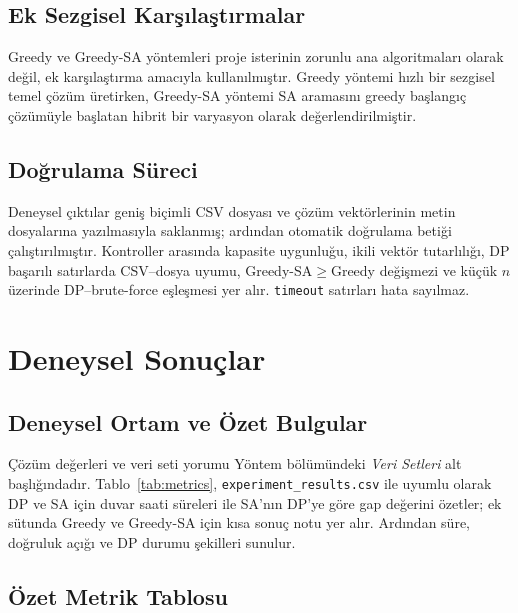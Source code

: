 \documentclass[conference,a4paper]{IEEEtran}
\begin{document}
\subsection{Ek Sezgisel Karşılaştırmalar}
Greedy ve Greedy-SA yöntemleri proje isterinin zorunlu ana algoritmaları olarak değil, ek karşılaştırma amacıyla kullanılmıştır. Greedy yöntemi hızlı bir sezgisel temel çözüm üretirken, Greedy-SA yöntemi SA aramasını greedy başlangıç çözümüyle başlatan hibrit bir varyasyon olarak değerlendirilmiştir.

\subsection{Doğrulama Süreci}
Deneysel çıktılar geniş biçimli CSV dosyası ve çözüm vektörlerinin metin dosyalarına yazılmasıyla saklanmış; ardından otomatik doğrulama betiği çalıştırılmıştır. Kontroller arasında kapasite uygunluğu, ikili vektör tutarlılığı, DP başarılı satırlarda CSV--dosya uyumu, Greedy-SA$\geq$Greedy değişmezi ve küçük $n$ üzerinde DP--brute-force eşleşmesi yer alır. \texttt{timeout} satırları hata sayılmaz.

\section{Deneysel Sonuçlar}

\subsection{Deneysel Ortam ve Özet Bulgular}
Çözüm değerleri ve veri seti yorumu Yöntem bölümündeki \emph{Veri Setleri} alt başlığındadır. Tablo~\ref{tab:metrics}, \texttt{experiment\_results.csv} ile uyumlu olarak DP ve SA için duvar saati süreleri ile SA'nın DP'ye göre gap değerini özetler; ek sütunda Greedy ve Greedy-SA için kısa sonuç notu yer alır. Ardından süre, doğruluk açığı ve DP durumu şekilleri sunulur.

\subsection{Özet Metrik Tablosu}

\begin{table}[!t]
\centering
\caption{DP ve SA Temelli Deneysel Karşılaştırma}
\label{tab:metrics}
\scriptsize
\setlength{\tabcolsep}{2pt}
\end{table}
\end{document}
